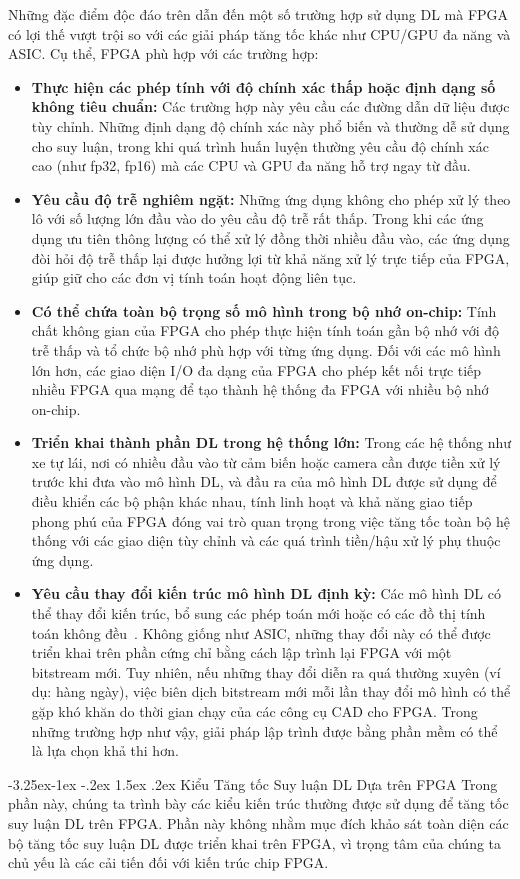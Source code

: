 \documentclass[a4paper]{article}
\makeatletter
\newcounter {subsubsubsection}[subsubsection]
\newcommand\subsubsubsection{\@startsection{subsubsubsection}{4}{\z@}%
                                     {-3.25ex\@plus -1ex \@minus -.2ex}%
                                     {1.5ex \@plus .2ex}%
                                     {\normalfont\normalsize\bfseries}}
\makeatother
\begin{document}
Những đặc điểm độc đáo trên dẫn đến một số trường hợp sử dụng DL mà FPGA có lợi thế vượt trội so với các giải pháp tăng tốc khác như CPU/GPU đa năng và ASIC. Cụ thể, FPGA phù hợp với các trường hợp:
\begin{itemize}
    \item \textbf{Thực hiện các phép tính với độ chính xác thấp hoặc định dạng số không tiêu chuẩn:} Các trường hợp này yêu cầu các đường dẫn dữ liệu được tùy chỉnh. Những định dạng độ chính xác này phổ biến và thường dễ sử dụng cho suy luận, trong khi quá trình huấn luyện thường yêu cầu độ chính xác cao (như fp32, fp16) mà các CPU và GPU đa năng hỗ trợ ngay từ đầu.
    \item \textbf{Yêu cầu độ trễ nghiêm ngặt:} Những ứng dụng không cho phép xử lý theo lô với số lượng lớn đầu vào do yêu cầu độ trễ rất thấp. Trong khi các ứng dụng ưu tiên thông lượng có thể xử lý đồng thời nhiều đầu vào, các ứng dụng đòi hỏi độ trễ thấp lại được hưởng lợi từ khả năng xử lý trực tiếp của FPGA, giúp giữ cho các đơn vị tính toán hoạt động liên tục.
    \item \textbf{Có thể chứa toàn bộ trọng số mô hình trong bộ nhớ on-chip:} Tính chất không gian của FPGA cho phép thực hiện tính toán gần bộ nhớ với độ trễ thấp và tổ chức bộ nhớ phù hợp với từng ứng dụng. Đối với các mô hình lớn hơn, các giao diện I/O đa dạng của FPGA cho phép kết nối trực tiếp nhiều FPGA qua mạng để tạo thành hệ thống đa FPGA với nhiều bộ nhớ on-chip.
    \item \textbf{Triển khai thành phần DL trong hệ thống lớn:} Trong các hệ thống như xe tự lái, nơi có nhiều đầu vào từ cảm biến hoặc camera cần được tiền xử lý trước khi đưa vào mô hình DL, và đầu ra của mô hình DL được sử dụng để điều khiển các bộ phận khác nhau, tính linh hoạt và khả năng giao tiếp phong phú của FPGA đóng vai trò quan trọng trong việc tăng tốc toàn bộ hệ thống với các giao diện tùy chỉnh và các quá trình tiền/hậu xử lý phụ thuộc ứng dụng.
    \item \textbf{Yêu cầu thay đổi kiến trúc mô hình DL định kỳ:} Các mô hình DL có thể thay đổi kiến trúc, bổ sung các phép toán mới hoặc có các đồ thị tính toán không đều~\cite{40}. Không giống như ASIC, những thay đổi này có thể được triển khai trên phần cứng chỉ bằng cách lập trình lại FPGA với một bitstream mới. Tuy nhiên, nếu những thay đổi diễn ra quá thường xuyên (ví dụ: hàng ngày), việc biên dịch bitstream mới mỗi lần thay đổi mô hình có thể gặp khó khăn do thời gian chạy của các công cụ CAD cho FPGA. Trong những trường hợp như vậy, giải pháp lập trình được bằng phần mềm có thể là lựa chọn khả thi hơn.
\end{itemize}
\subsubsubsection{Kiểu Tăng tốc Suy luận DL Dựa trên FPGA}
    Trong phần này, chúng ta trình bày các kiểu kiến trúc thường được sử dụng để tăng tốc suy luận DL trên FPGA. Phần này không nhằm mục đích khảo sát toàn diện các bộ tăng tốc suy luận DL được triển khai trên FPGA, vì trọng tâm của chúng ta chủ yếu là các cải tiến đối với kiến trúc chip FPGA.
    
\end{document}
